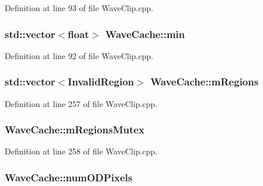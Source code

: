 Definition at line 93 of file Wave\+Clip.\+cpp.

\subsubsection[{\texorpdfstring{min}{min}}]{\setlength{\rightskip}{0pt plus 5cm}std\+::vector$<$float$>$ Wave\+Cache\+::min}\hypertarget{class_wave_cache_ae4c8765b5c8a9a7a9422135c378061fe}{}\label{class_wave_cache_ae4c8765b5c8a9a7a9422135c378061fe}


Definition at line 92 of file Wave\+Clip.\+cpp.

\subsubsection[{\texorpdfstring{m\+Regions}{mRegions}}]{\setlength{\rightskip}{0pt plus 5cm}std\+::vector$<${\bf Invalid\+Region}$>$ Wave\+Cache\+::m\+Regions\hspace{0.3cm}{\ttfamily [protected]}}\hypertarget{class_wave_cache_add462bc5326fd11c2bfd9caf53ab70e1}{}\label{class_wave_cache_add462bc5326fd11c2bfd9caf53ab70e1}


Definition at line 257 of file Wave\+Clip.\+cpp.

\subsubsection[{\texorpdfstring{m\+Regions\+Mutex}{mRegionsMutex}}]{ Wave\+Cache\+::m\+Regions\+Mutex\hspace{0.3cm}{\ttfamily [protected]}}\hypertarget{class_wave_cache_a04122f63b832b6c168df740974eb50fe}{}\label{class_wave_cache_a04122f63b832b6c168df740974eb50fe}


Definition at line 258 of file Wave\+Clip.\+cpp.

\subsubsection[{\texorpdfstring{num\+O\+D\+Pixels}{numODPixels}}]{ Wave\+Cache\+::num\+O\+D\+Pixels}\hypertarget{class_wave_cache_adaf6da5f57fd744a22bc753e4f7a4d73}{}\label{class_wave_cache_adaf6da5f57fd744a22bc753e4f7a4d73}


